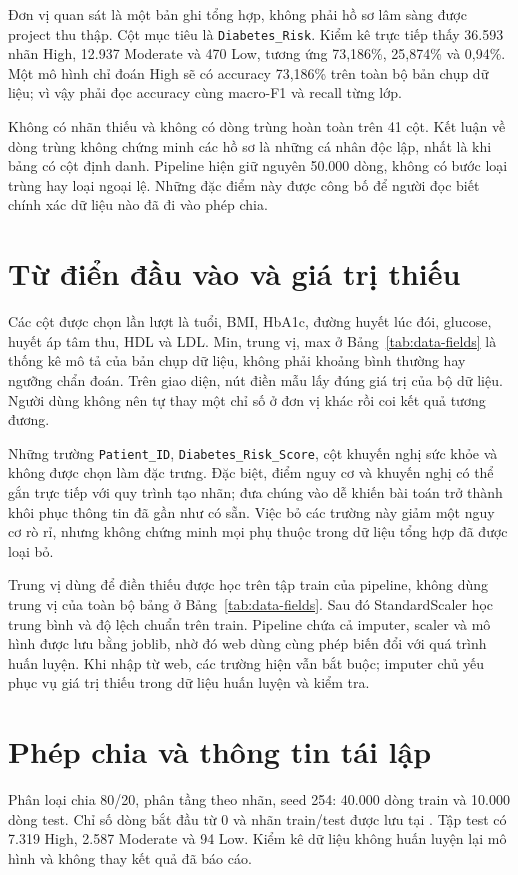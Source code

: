 Đơn vị quan sát là một bản ghi tổng hợp, không phải hồ sơ lâm sàng được project thu thập. Cột mục tiêu là \texttt{Diabetes\_Risk}. Kiểm kê trực tiếp thấy 36.593 nhãn High, 12.937 Moderate và 470 Low, tương ứng 73,186\%, 25,874\% và 0,94\%. Một mô hình chỉ đoán High sẽ có accuracy 73,186\% trên toàn bộ bản chụp dữ liệu; vì vậy phải đọc accuracy cùng macro-F1 và recall từng lớp.

Không có nhãn thiếu và không có dòng trùng hoàn toàn trên 41 cột. Kết luận về dòng trùng không chứng minh các hồ sơ là những cá nhân độc lập, nhất là khi bảng có cột định danh. Pipeline hiện giữ nguyên 50.000 dòng, không có bước loại trùng hay loại ngoại lệ. Những đặc điểm này được công bố để người đọc biết chính xác dữ liệu nào đã đi vào phép chia.
\section{Từ điển đầu vào và giá trị thiếu}

Các cột được chọn lần lượt là tuổi, BMI, HbA1c, đường huyết lúc đói, glucose, huyết áp tâm thu, HDL và LDL. Min, trung vị, max ở Bảng~\ref{tab:data-fields} là thống kê mô tả của bản chụp dữ liệu, không phải khoảng bình thường hay ngưỡng chẩn đoán. Trên giao diện, nút điền mẫu lấy đúng giá trị của bộ dữ liệu. Người dùng không nên tự thay một chỉ số ở đơn vị khác rồi coi kết quả tương đương.

Những trường \texttt{Patient\_ID}, \texttt{Diabetes\_Risk\_Score}, cột khuyến nghị sức khỏe và  không được chọn làm đặc trưng. Đặc biệt, điểm nguy cơ và khuyến nghị có thể gắn trực tiếp với quy trình tạo nhãn; đưa chúng vào dễ khiến bài toán trở thành khôi phục thông tin đã gần như có sẵn. Việc bỏ các trường này giảm một nguy cơ rò rỉ, nhưng không chứng minh mọi phụ thuộc trong dữ liệu tổng hợp đã được loại bỏ.

Trung vị dùng để điền thiếu được học trên tập train của pipeline, không dùng trung vị của toàn bộ bảng ở Bảng~\ref{tab:data-fields}. Sau đó StandardScaler học trung bình và độ lệch chuẩn trên train. Pipeline chứa cả imputer, scaler và mô hình được lưu bằng joblib, nhờ đó web dùng cùng phép biến đổi với quá trình huấn luyện. Khi nhập từ web, các trường hiện vẫn bắt buộc; imputer chủ yếu phục vụ giá trị thiếu trong dữ liệu huấn luyện và kiểm tra.
\section{Phép chia và thông tin tái lập}
Phân loại chia 80/20, phân tầng theo nhãn, seed 254: 40.000 dòng train và 10.000 dòng test. Chỉ số dòng bắt đầu từ 0 và nhãn train/test được lưu tại . Tập test có 7.319 High, 2.587 Moderate và 94 Low. Kiểm kê dữ liệu không huấn luyện lại mô hình và không thay kết quả đã báo cáo.


